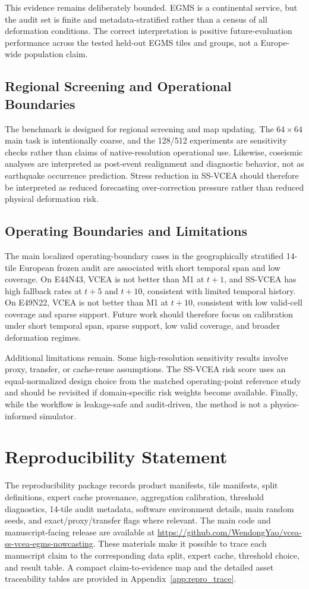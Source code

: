 \documentclass[lettersize,journal]{IEEEtran}
\newcommand{\projectrepo}{\url{https://github.com/WendongYao/vcea-ss-vcea-egms-nowcasting}}
\begin{document}
This evidence remains deliberately bounded. EGMS is a continental service, but the audit set is finite and metadata-stratified rather than a census of all deformation conditions. The correct interpretation is positive future-evaluation performance across the tested held-out EGMS tiles and groups, not a Europe-wide population claim.

\subsection{Regional Screening and Operational Boundaries}
The benchmark is designed for regional screening and map updating. The $64\times64$ main task is intentionally coarse, and the 128/512 experiments are sensitivity checks rather than claims of native-resolution operational use. Likewise, coseismic analyses are interpreted as post-event realignment and diagnostic behavior, not as earthquake occurrence prediction.
Stress reduction in SS-VCEA should therefore be interpreted as reduced forecasting over-correction pressure rather than reduced physical deformation risk.

\subsection{Operating Boundaries and Limitations}
The main localized operating-boundary cases in the geographically stratified 14-tile European frozen audit are associated with short temporal span and low coverage. On E44N43, VCEA is not better than M1 at $t{+}1$, and SS-VCEA has high fallback rates at $t{+}5$ and $t{+}10$, consistent with limited temporal history. On E49N22, VCEA is not better than M1 at $t{+}10$, consistent with low valid-cell coverage and sparse support. Future work should therefore focus on calibration under short temporal span, sparse support, low valid coverage, and broader deformation regimes.

Additional limitations remain. Some high-resolution sensitivity results involve proxy, transfer, or cache-reuse assumptions. The SS-VCEA risk score uses an equal-normalized design choice from the matched operating-point reference study and should be revisited if domain-specific risk weights become available. Finally, while the workflow is leakage-safe and audit-driven, the method is not a physics-informed simulator.

\section{Reproducibility Statement}
The reproducibility package records product manifests, tile manifests, split definitions, expert cache provenance, aggregation calibration, threshold diagnostics, 14-tile audit metadata, software environment details, main random seeds, and exact/proxy/transfer flags where relevant. The main code and manuscript-facing release are available at \projectrepo. These materials make it possible to trace each manuscript claim to the corresponding data split, expert cache, threshold choice, and result table. A compact claim-to-evidence map and the detailed asset traceability tables are provided in Appendix~\ref{app:repro_trace}.
\end{document}
